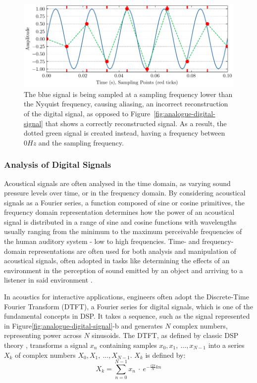 \begin{figure}
    \centering
    \includegraphics[width=1\linewidth]{aliasing}
    \caption{The blue signal is being sampled at a sampling frequency lower than the Nyquist frequency, causing aliasing, an incorrect reconstruction of the digital signal, as opposed to Figure~\ref{fig:analogue-digital-signal} that shows a correctly reconstructed signal. As a result, the dotted green signal is created instead, having a frequency between $0Hz$ and the sampling frequency.}
\label{fig:aliasing}
\end{figure}

\subsubsection{Analysis of Digital Signals}
Acoustical signals are often analysed in the time domain, as varying sound pressure levels over time, or in the frequency domain. By considering acoustical signals as a Fourier series, a function composed of sine or cosine primitives, the frequency domain representation determines how the power of an acoustical signal is distributed in a range of sine and cosine functions with wavelengths usually ranging from the minimum to the maximum perceivable frequencies of the human auditory system - low to high frequencies. Time- and frequency-domain representations are often used for both analysis and manipulation of acoustical signals, often adopted in tasks like determining the effects of an environment in the perception of sound emitted by an object and arriving to a listener in said environment \cite{ballou2013handbook}. \par 
In acoustics for interactive applications, engineers often adopt the Discrete-Time Fourier Transform (DTFT), a Fourier series for digital signals, which is one of the fundamental concepts in DSP. It takes a sequence, such as the signal represented in Figure\ref{fig:analogue-digital-signal}-b and generates $N$ complex numbers, representing power across $N$ sinusoids. The DTFT, as defined by classic DSP theory \cite{shenoi2005introduction}, transforms a signal $x_n$ containing samples $x_0, x_1,~\dots, x_{N-1}$ into a series $X_k$ of complex numbers $X_0, X_1,~\dots, X_{N-1}$. $X_k$ is defined by:
\begin{equation}
    X_k = \sum_{n=0}^{N-1} x_n~\cdot~e^{-\frac{i2\pi}{N}kn}
\end{equation}

